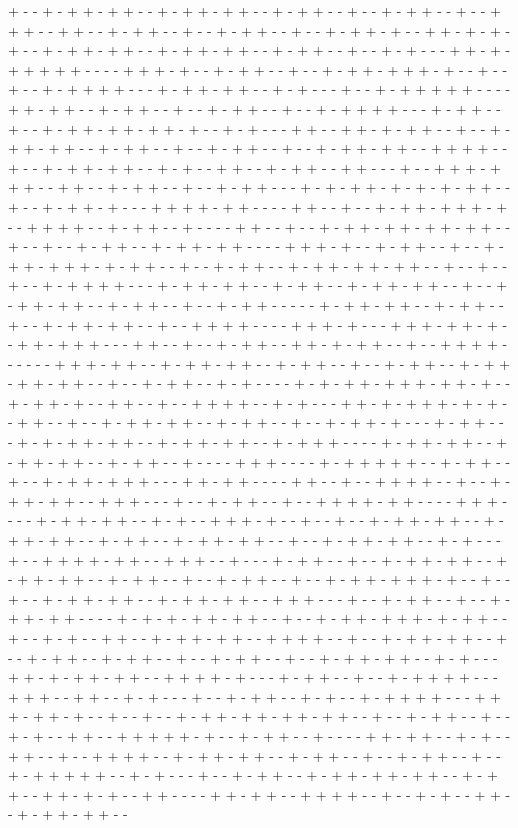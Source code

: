 + - - + - + + - + + - - + - + + - + + - - + - + + - - + - - + - + + - - + - - + + + - - + + - - + - + + - - + - - + - + + - - + - - + - + + - + - - + + - + - + - + - - + - + + - + + - - + - + + - + + - - + - + + - - + - - + - + - - - + + - + - + + + + + - - - - + + + - + - - + - + + - - + - - + - + + - + + + - + - - + - - + - - + - + + + + - - - + - + + - + + - - + - + - - - + - - + - + + + + + - - - - + + - + + - - + - + + - - + - - + - + + - - + - - + - + + + + - - - + - + + - - + - - + - + + - + + - + + - + - - + - + - - - + + - - + + - + - + + - - + - - + - + + - + + - - + - + + - - + - - + - + + - - + - - + - + + - + + - - + + + + - - + - - + - + + - + + - - + - + - - + + - - + - + + - - + + - - - + - - + + + - + + + - - + + - - + - + + - - + - - + - + + - - - + - + - + + - + - + - + - + + - - + - - + - + + - + - - - + + + + - + + - - - - + + - - + - - + - + + - + + + - + - - + + + + - - + - + + - - + - - - - + + - - + - - + - + + - + + - + + - + + - - + - - + - - + - + + - - + - + + - + + - - - - + + + - + - - + - + + - - + - - + - + + - + + + - + - + + - - + - - + - + + - - + - + + - + + - + + - - + - - + - - + - - + - + + + + - - - + - + + - + + - - + - + + - - + - + + - + + - - + - - + - + + - + + - - + - + + - - + - - + - + + - - - - - + - + + - + + - - + - + + - - + - - + - + + - + + - - + - - + + + + - - - - + + + - + - - - + + + - + + - + - - + + - + + + - - - + + - - + - - + - + + - - + + - + - + + - - + - - + + + + - - - - - - + + + - + + - - + - + + - + + - - + - + + - - + - - + - + + - - + - + + - + + - + + - - + - - + - + + - - + - + - - - - + - + - + + - + + + - + + - + - - + - + + - + - - + + - - + - - + + + + - - + - + - - - + + - + - + + + - + - + - - + + - - + - - + - + + - + + - - + - + + - - + - - + - + + - + - - - + - + + - - - + - + - + + - + + - - + - + + - + + - - + - + + + - - - - + - + + - + + - - + - + + - + + - - + - + + - - + - - - - + + + - - - - + - + + + + + - - + - + + - - + - - + - + + - + + + - - - + + - + + - - - - + + - - + - - + + + + - - + - - + - + + - + + - - + + + - - - + - - + - + + - - + - - + + + + - + + - - - - + + + - - - - + - + + - + + - - + - + - - + + + - + - - + - - + - - + - + + - + + - - + - + + - + + - - + - + + - - + - + + - + + - - + - - + - + + - + + - - + - + - - - + - - + + + + - + + - - + + + - - + - - - + - + + - - + - - + - + + - + + - - + - + + - + + - - + - + + - - + - - + - + + - - + - - + - + + - + + + - + - - + - - + - - + - + + - + + - - + - + + - + + - - + + + - - - + - - + - + + - - + - - + - + + - + + - - - - + - + - + - + + - + + - - + - - + - + + - + + + - + - + + - - + - - + - + - - + + - - + - + + - + + - - + + + + - - + - - + - + + - + + - - + - - + - + + - - + - + + - - + - - + - + + - - + - - + - + + - + + - - + - + - - - + + - + - + + - + + - - + + + + - + - - - + - + + - - + - - + - + + + + - - - + + + - - + + - - + - + - - - + - - + - + + - - + - + - - + - + + + + - - - + + + - + + - + - - + - - + - - + - + + - + + - + + - + + - - + - - + - + + - - + - - + - + - - + + - - + + + + + - + - - + - + + - - + - - - - + + - + + - - + - + - - + + - - + - - + + + + - - + - + + - + + - - + - + + - - + - - + - + + - - + - - + - + + + + + - - + - + - - - + - - + - + + - - + - + + - + + - + + - - + - + + - - + + - + - + - - + + - - - - + + - + + - - + + + + - - + - - + - + - - + + - - + - + + - + + - - 